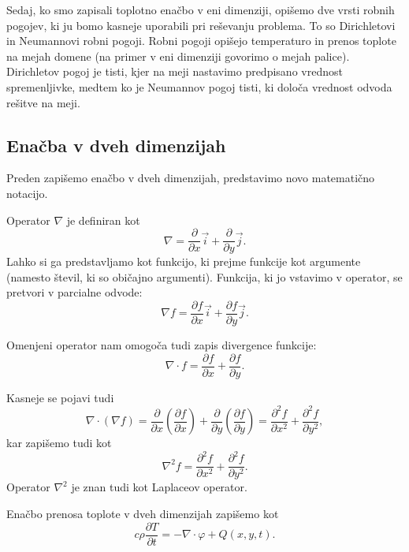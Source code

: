 \documentclass[a4paper,11pt]{article}
\begin{document}
	Sedaj, ko smo zapisali toplotno enačbo v eni dimenziji, opišemo dve vrsti robnih pogojev, ki ju bomo kasneje uporabili pri reševanju problema. To so Dirichletovi in Neumannovi robni pogoji. Robni pogoji opišejo temperaturo in prenos toplote na mejah domene (na primer v eni dimenziji govorimo o mejah palice). Dirichletov pogoj je tisti, kjer na meji nastavimo predpisano vrednost spremenljivke, medtem ko je Neumannov pogoj tisti, ki določa vrednost odvoda rešitve na meji.
	
	\subsection{Enačba v dveh dimenzijah}
	
	Preden zapišemo enačbo v dveh dimenzijah, predstavimo novo matematično notacijo.
	
	Operator $\nabla$ je definiran kot
	\begin{equation}
		\nabla = \frac{\partial}{\partial x}\vec{i} + \frac{\partial}{\partial y}\vec{j}.
	\end{equation}
	Lahko si ga predstavljamo kot funkcijo, ki prejme funkcije kot argumente (namesto števil, ki so običajno argumenti). Funkcija, ki jo vstavimo v operator, se pretvori v parcialne odvode:
	\begin{equation}
		\nabla f = \frac{\partial f}{\partial x}\vec{i} + \frac{\partial f}{\partial y}\vec{j}.
	\end{equation}
	
	Omenjeni operator nam omogoča tudi zapis divergence funkcije:
	\begin{equation}
		\nabla \cdot f = \frac{\partial f}{\partial x} + \frac{\partial f}{\partial y}.
	\end{equation}
	
	Kasneje se pojavi tudi
	\begin{equation}
		\nabla \cdot (\nabla f)
		= \frac{\partial}{\partial x}\left(\frac{\partial f}{\partial x}\right)
		+ \frac{\partial}{\partial y}\left(\frac{\partial f}{\partial y}\right)
		= \frac{\partial^2 f}{\partial x^2} + \frac{\partial^2 f}{\partial y^2},
	\end{equation}
	kar zapišemo tudi kot
	\begin{equation}
		\nabla^2 f = \frac{\partial^2 f}{\partial x^2} + \frac{\partial^2 f}{\partial y^2}.
	\end{equation}
	Operator $\nabla^2$ je znan tudi kot Laplaceov operator.
	
	Enačbo prenosa toplote v dveh dimenzijah zapišemo kot
	\begin{equation}
		c\rho \frac{\partial T}{\partial t} = -\nabla \cdot \varphi + Q(x, y, t).
	\end{equation}
	
\end{document}
